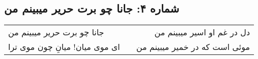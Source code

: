 \begin{center}
\section*{شماره ۴: جانا چو برت حریر میبینم من}
\label{sec:004}
\begin{longtable}{l p{0.5cm} r}
جانا چو برت حریر میبینم من
&&
دل در غم او اسیر میبینم من
\\
ای موی میان! میانِ چون موی ترا
&&
موئی است که در خمیر میبینم من
\\
\end{longtable}
\end{center}
